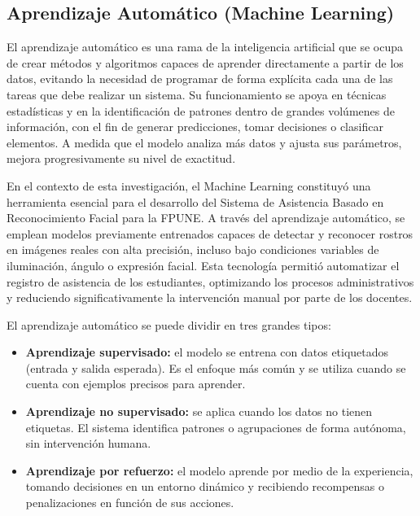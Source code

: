\subsection{Aprendizaje Automático (Machine Learning)}

El aprendizaje automático es una rama de la inteligencia artificial que se ocupa de crear métodos y algoritmos capaces de aprender directamente a partir de los datos, evitando la necesidad de programar de forma explícita cada una de las tareas que debe realizar un sistema. Su funcionamiento se apoya en técnicas estadísticas y en la identificación de patrones dentro de grandes volúmenes de información, con el fin de generar predicciones, tomar decisiones o clasificar elementos. A medida que el modelo analiza más datos y ajusta sus parámetros, mejora progresivamente su nivel de exactitud\cite{acevedo2017,googleML}.

En el contexto de esta investigación, el Machine Learning constituyó una herramienta esencial para el desarrollo del Sistema de Asistencia Basado en Reconocimiento Facial para la FPUNE.
A través del aprendizaje automático, se emplean modelos previamente entrenados capaces de detectar y reconocer rostros en imágenes reales con alta precisión, incluso bajo condiciones variables de iluminación, ángulo o expresión facial.
Esta tecnología permitió automatizar el registro de asistencia de los estudiantes, optimizando los procesos administrativos y reduciendo significativamente la intervención manual por parte de los docentes\cite{valverde2019}.

El aprendizaje automático se puede dividir en tres grandes tipos:

\begin{itemize}
  \item \textbf{Aprendizaje supervisado:} el modelo se entrena con datos etiquetados (entrada y salida esperada). Es el enfoque más común y se utiliza cuando se cuenta con ejemplos precisos para aprender.

  \item \textbf{Aprendizaje no supervisado:} se aplica cuando los datos no tienen etiquetas. El sistema identifica patrones o agrupaciones de forma autónoma, sin intervención humana.

  \item \textbf{Aprendizaje por refuerzo:} el modelo aprende por medio de la experiencia, tomando decisiones en un entorno dinámico y recibiendo recompensas o penalizaciones en función de sus acciones.
\end{itemize}


